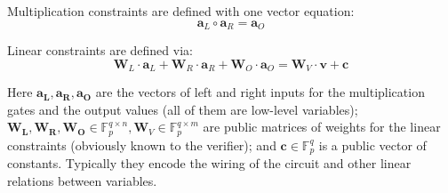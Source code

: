 \documentclass[../lecture-notes-148x210.tex]{subfiles}
\begin{document}
Multiplication constraints are defined with one vector equation:
$$ \mathbf{a}_L \circ \mathbf{a}_R = \mathbf{a}_O $$

Linear constraints are defined via:
$$ \mathbf{W}_L \cdot \mathbf{a}_L + \mathbf{W}_R \cdot \mathbf{a}_R + \mathbf{W}_O \cdot \mathbf{a}_O = \mathbf{W}_V \cdot \mathbf{v} + \mathbf{c} $$

Here $\mathbf{a_L, a_R, a_O}$ are the vectors of left and right inputs for the multiplication gates and the output values (all of them are low-level variables); $\mathbf{W_L, W_R, W_O} \in \mathbb{F}_p^{q \times n}, \mathbf{W}_V \in \mathbb{F}_p^{q \times m}$ are public matrices of weights for the linear constraints (obviously known to the verifier); and $\mathbf{c} \in \mathbb{F}_p^q$ is a public vector of constants. Typically they encode the wiring of the circuit and other linear relations between variables.
\end{document}
